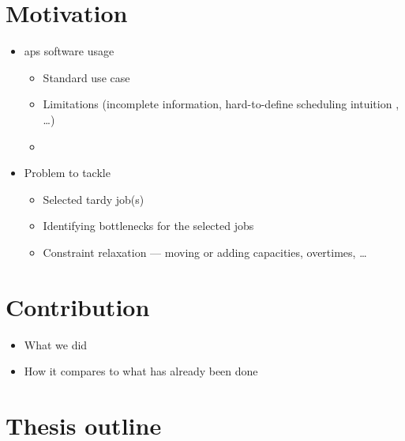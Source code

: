  \label{chap:introduction}

\section*{Motivation} \label{sec:introduction/motivation}

\begin{itemize}
    \item \ac{aps} software usage
    \begin{itemize}
        \item Standard use case
        \item Limitations (incomplete information, hard-to-define scheduling intuition , \dots)
        \item {}
    \end{itemize}

    \item Problem to tackle
    \begin{itemize}
        \item Selected tardy job(s)
        \item Identifying bottlenecks for the selected jobs
        \item Constraint relaxation --- moving or adding capacities, overtimes, \dots
    \end{itemize}
\end{itemize}

\section*{Contribution} \label{sec:introduction/contribution}

\begin{itemize}
    \item What we did
    \item How it compares to what has already been done
\end{itemize}

\section*{Thesis outline} \label{sec:introduction/thesis-outline}

